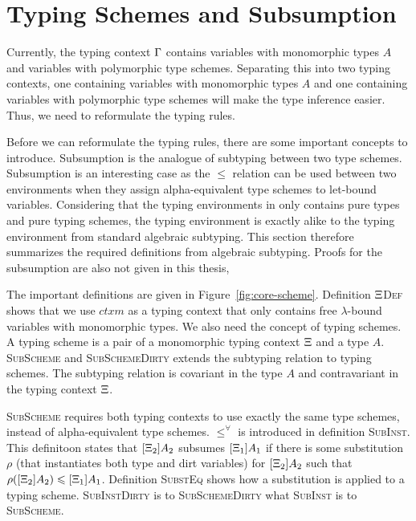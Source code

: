 \section{Typing Schemes and Subsumption}
Currently, the typing context $\Gamma$ contains variables with monomorphic types $A$ and variables with polymorphic type schemes. Separating this into two typing contexts, one containing variables with monomorphic types $A$ and one containing variables with polymorphic type schemes will make the type inference easier. Thus, we need to reformulate the typing rules. \cite{dolan2017algebraic}

Before we can reformulate the typing rules, there are some important concepts to introduce. Subsumption is the analogue of subtyping between two type schemes. Subsumption is an interesting case as the $\le$ relation can be used between two environments when they assign alpha-equivalent type schemes to let-bound variables. Considering that the typing environments in \core only contains pure types and pure typing schemes, the typing environment is exactly alike to the typing environment from standard algebraic subtyping. This section therefore summarizes the required definitions from algebraic subtyping. Proofs for the subsumption are also not given in this thesis, \cite{dolan2017algebraic}

The important definitions are given in Figure~\ref{fig:core-scheme}. Definition \textsc{$\Xi$Def} shows that we use $ctxm$ as a typing context that only contains free $\lambda$-bound variables with monomorphic types. We also need the concept of typing schemes. A typing scheme is a pair of a monomorphic typing context $\Xi$ and a type $A$. \textsc{SubScheme} and \textsc{SubSchemeDirty} extends the subtyping relation to typing schemes. The subtyping relation is covariant in the type $A$ and contravariant in the typing context $\Xi$. 

\textsc{SubScheme} requires both typing contexts to use exactly the same type schemes, instead of alpha-equivalent type schemes. $\le^\forall$ is introduced in definition \textsc{SubInst}. This definitoon states that $[\Xi_2]A_2$ subsumes $[\Xi_1]A_1$ if there is some substitution $\rho$ (that instantiates both type and dirt variables) for $[\Xi_2]A_2$ such that $\rho([\Xi_2]A_2) \leqslant [\Xi_1]A_1$. Definition \textsc{SubstEq} shows how a substitution is applied to a typing scheme. \textsc{SubInstDirty} is to \textsc{SubSchemeDirty} what \textsc{SubInst} is to \textsc{SubScheme}.

